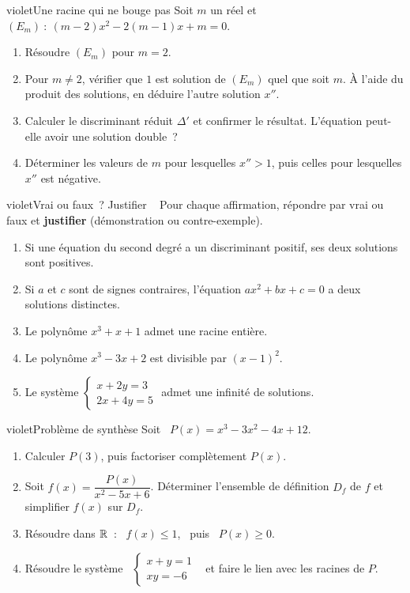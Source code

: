 \begin{exo}{violet}{Une racine qui ne bouge pas }
Soit $m$ un réel et \ $(E_m)~:\ (m-2)x^2-2(m-1)x+m=0$.
\begin{enumerate}
  \item Résoudre $(E_m)$ pour $m=2$.
  \item Pour $m\neq2$, vérifier que $1$ est solution de $(E_m)$ quel que soit $m$. À l'aide du produit des solutions, en déduire l'autre solution $x''$.
  \item Calculer le discriminant réduit $\Delta'$ et confirmer le résultat. L'équation peut-elle avoir une solution double~?
  \item Déterminer les valeurs de $m$ pour lesquelles $x''>1$, puis celles pour lesquelles $x''$ est négative.
\end{enumerate}
\end{exo}

\begin{exo}{violet}{Vrai ou faux~? Justifier \demo\ }
Pour chaque affirmation, répondre par vrai ou faux et \textbf{justifier} (démonstration ou contre-exemple).
\begin{enumerate}
  \item Si une équation du second degré a un discriminant positif, ses deux solutions sont positives.
  \item Si $a$ et $c$ sont de signes contraires, l'équation $ax^2+bx+c=0$ a deux solutions distinctes.
  \item Le polynôme $x^3+x+1$ admet une racine entière.
  \item Le polynôme $x^3-3x+2$ est divisible par $(x-1)^2$.
  \item Le système $\begin{cases}x+2y=3\\2x+4y=5\end{cases}$ admet une infinité de solutions.
\end{enumerate}
\end{exo}

\begin{exo}{violet}{Problème de synthèse }
Soit \ $P(x)=x^3-3x^2-4x+12$.
\begin{enumerate}
  \item Calculer $P(3)$, puis factoriser complètement $P(x)$.
  \item Soit $f(x)=\dfrac{P(x)}{x^2-5x+6}$. Déterminer l'ensemble de définition $D_f$ de $f$ et simplifier $f(x)$ sur $D_f$.
  \item Résoudre dans $\mathbb{R}$~: \ $f(x)\leq1$, \ puis \ $P(x)\geq0$.
  \item Résoudre le système \ $\begin{cases}x+y=1\\xy=-6\end{cases}$ \ et faire le lien avec les racines de $P$.
\end{enumerate}
\end{exo}



